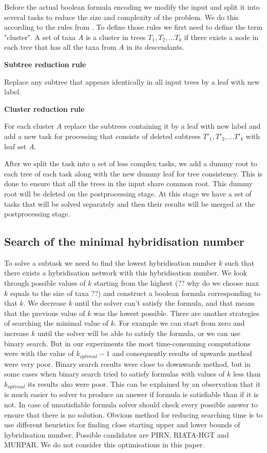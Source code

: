 \documentclass[runningheads, envcountsame, a4paper]{llncs}
\begin{document}
Before the actual boolean formula encoding we modify the input and split it into several tasks to reduce the size and complexity of the problem. We do this according to the rules from \cite {Efficiently Calculating Evolutionary Tree Measures Using SAT Maria Luisa Bonet1 and Katherine St. John2}. To define those rules we first need to define the term "cluster". A set of taxa $A$ is a cluster in trees $T_1, T_2, ... T_k$ if there exists a node in each tree that has all the taxa from $A$ in its descendants.

\textbf{Subtree reduction rule}

Replace any subtree that appears identically in all input trees by a leaf with new label.

\textbf{Cluster reduction rule}

For each cluster $A$ replace the subtrees containing it by a leaf with new label and add a new task for processing that consists of deleted subtrees $T'_1, T'_2, ... T'_k$ with leaf set $A$.

After we split the task into a set of less complex tasks, we add a dummy root to each tree of each task along with the new dummy leaf for tree consistency. This is done to ensure that all the trees in the input share common root. This dummy root will be deleted on the postprocessing stage. At this stage we have a set of tasks that will be solved separately and then their results will be merged at the postprocessing stage.

\subsection{Search of the minimal hybridisation number}

To solve a subtask we need to find the lowest hybridisation number $k$ such that there exists a hybridisation network with this hybridisation number. We look through possible values of $k$ starting from the highest (?? why do we choose max $k$ equals to the size of taxa ??) and construct a boolean formula corresponding to that $k$. We decrease $k$ until the solver can't satisfy the formula, and that means that the previous value of $k$ was the lowest possible. There are another strategies of searching the minimal value of $k$. For example we can start from zero and increase $k$ until the solver will be able to satisfy the formula, or we can use binary search. But in our experiments the most time-consuming computations were with the value of $k_{optimal} - 1$ and consequently results of upwards method were very poor. Binary search results were close to downwards method, but in some cases when binary search tried to satisfy formulas with values of $k$ less than $k_{optimal}$ its results also were poor. This can be explained by an observation that it is much easier to solver to produce an answer if formula is satisfiable than if it is not. In case of unsatisfiable formula solver should check every possible answer to ensure that there is no solution. Obvious method for reducing searching time is to use different heuristics for finding close starting upper and lower bounds of hybridisation number. Possible candidates are PIRN, RIATA-HGT and MURPAR. We do not consider this optimisations in this paper.
\end{document}

